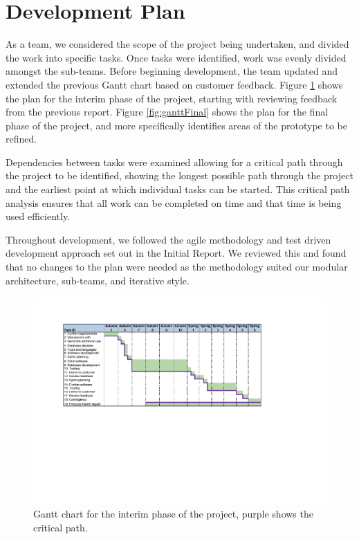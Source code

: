 \section{Development Plan}
\label{sec:developmentplan}

As a team, we considered the scope of the project being undertaken, and 
divided the work into specific tasks. Once tasks were identified, work was 
evenly divided amongst the sub-teams.
Before beginning development, the team updated and extended 
the previous Gantt chart based on customer feedback.
Figure \ref{fig:ganttInterim}  shows the plan for the interim phase of the project, 
starting with reviewing feedback from the previous report.
Figure \ref{fig:ganttFinal}  shows the plan for the final phase of the project, and 
more specifically identifies areas of the prototype to be refined.

Dependencies between tasks were examined allowing for a critical path 
through the project to be identified, showing the longest possible path through 
the project and the earliest point at which individual tasks can be started.
This critical path analysis ensures that all work can be completed on time and 
that time is being used efficiently. 

Throughout development, we followed the agile methodology and test driven development approach set out in the Initial Report. We reviewed this and found that no changes to the plan were needed as the methodology suited our modular architecture, sub-teams, and iterative style.

\begin{figure}[H]
  \centering
  \includegraphics[width= 15cm]{images/GantInterim.pdf}
  \caption{Gantt chart for the interim phase of the project, purple shows the critical path.}
  \label{fig:ganttInterim}
\end{figure}

